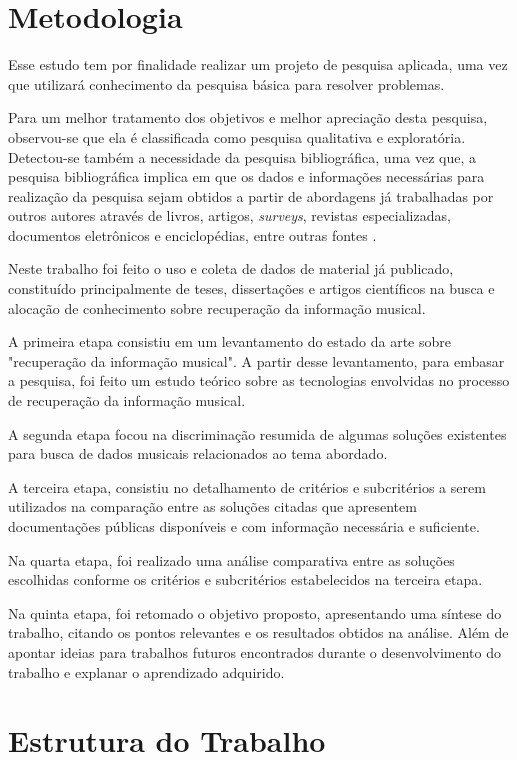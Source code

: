 \section{Metodologia}

Esse estudo tem por finalidade realizar um projeto de pesquisa aplicada, uma vez que utilizará conhecimento da pesquisa básica para resolver problemas.

Para um melhor tratamento dos objetivos e melhor apreciação desta pesquisa, observou-se que ela é classificada como pesquisa qualitativa e exploratória. Detectou-se também a necessidade da pesquisa bibliográfica, uma vez que, a pesquisa bibliográfica implica em que os dados e informações necessárias para realização da pesquisa sejam obtidos a partir de abordagens já trabalhadas por outros autores através de livros, artigos, \textit{surveys}, revistas especializadas, documentos eletrônicos e enciclopédias, entre outras fontes \cite{ednalucia2005}.

Neste trabalho foi feito o uso e coleta de dados de material já publicado, constituído principalmente de teses, dissertações e artigos científicos na busca e alocação de conhecimento sobre recuperação da informação musical.

A primeira etapa consistiu em um levantamento do estado da arte sobre "recuperação da informação musical". A partir desse levantamento, para embasar a pesquisa, foi feito um estudo teórico sobre as tecnologias envolvidas no processo de recuperação da informação musical.

A segunda etapa focou na discriminação resumida de algumas soluções existentes para busca de dados musicais relacionados ao tema abordado.

A terceira etapa, consistiu no detalhamento de critérios e subcritérios a serem utilizados na comparação entre as soluções citadas que apresentem documentações públicas disponíveis e com informação necessária e suficiente.

Na quarta etapa, foi realizado uma análise comparativa entre as soluções escolhidas conforme os critérios e subcritérios estabelecidos na terceira etapa.

Na quinta etapa, foi retomado o objetivo proposto, apresentando uma síntese do trabalho, citando os pontos relevantes e os resultados obtidos na análise. Além de apontar ideias para trabalhos futuros encontrados durante o desenvolvimento do trabalho e explanar o aprendizado adquirido.

\section{Estrutura do Trabalho}

